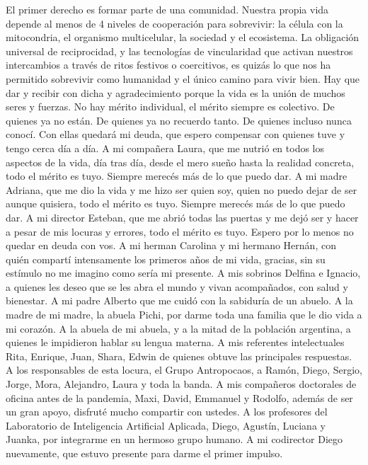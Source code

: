 \documentclass[a4paper,11pt]{book}
\theoremstyle{definition}
\begin{document}
El primer derecho es formar parte de una comunidad.
%
Nuestra propia vida depende al menos de 4 niveles de cooperación para sobrevivir: la célula con la mitocondria, el organismo multicelular, la sociedad y el ecosistema.
%
La obligación universal de reciprocidad, y las tecnologías de vincularidad que activan nuestros intercambios a través de ritos festivos o coercitivos, es quizás lo que nos ha permitido sobrevivir como humanidad y el único camino para vivir bien.
%
Hay que dar y recibir con dicha y agradecimiento porque la vida es la unión de muchos seres y fuerzas.
%
No hay mérito individual, el mérito siempre es colectivo.
%
De quienes ya no están.
%
De quienes ya no recuerdo tanto.
%
De quienes incluso nunca conocí.
%
Con ellas quedará mi deuda, que espero compensar con quienes tuve y tengo cerca día a día.
%
A mi compañera Laura, que me nutrió en todos los aspectos de la vida, día tras día, desde el mero sueño hasta la realidad concreta, todo el mérito es tuyo. Siempre merecés más de lo que puedo dar.
%
A mi madre Adriana, que me dio la vida y me hizo ser quien soy, quien no puedo dejar de ser aunque quisiera, todo el mérito es tuyo. Siempre merecés más de lo que puedo dar.
%
A mi director Esteban, que me abrió todas las puertas y me dejó ser y hacer a pesar de mis locuras y errores, todo el mérito es tuyo. Espero por lo menos no quedar en deuda con vos.
%
A mi herman Carolina y mi hermano Hernán, con quién compartí intensamente los primeros años de mi vida, gracias, sin su estímulo no me imagino como sería mi presente.
%
A mis sobrinos Delfina e Ignacio, a quienes les deseo que se les abra el mundo y vivan acompañados, con salud y bienestar.
%
A mi padre Alberto que me cuidó con la sabiduría de un abuelo.
%
A la madre de mi madre, la abuela Pichi, por darme toda una familia que le dio vida a mi corazón.
%
A la abuela de mi abuela, y a la mitad de la población argentina, a quienes le impidieron hablar su lengua materna.
%
A mis referentes intelectuales Rita, Enrique, Juan, Shara, Edwin de quienes obtuve las principales respuestas.
%
A los responsables de esta locura, el Grupo Antropocaos, a Ramón, Diego, Sergio, Jorge, Mora, Alejandro, Laura y toda la banda.
%
A mis compañeros doctorales de oficina antes de la pandemia, Maxi, David, Emmanuel y Rodolfo, además de ser un gran apoyo, disfruté mucho compartir con ustedes.
%
A los profesores del Laboratorio de Inteligencia Artificial Aplicada, Diego, Agustín, Luciana y Juanka, por integrarme en un hermoso grupo humano.
%
A mi codirector Diego nuevamente, que estuvo presente para darme el primer impulso.
\end{document}
